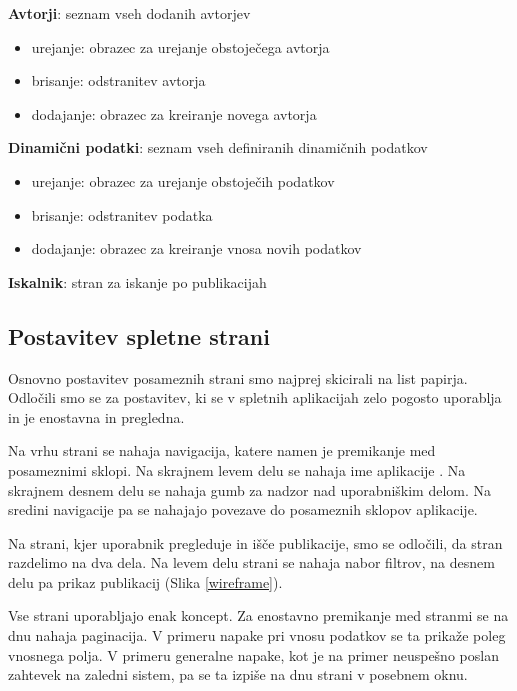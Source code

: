 \documentclass[a4paper, 12pt]{book}
\begin{document}
\begin{description}
\item \textbf{Avtorji}: seznam vseh dodanih avtorjev
\begin{itemize}
\item urejanje: obrazec za urejanje obstoječega avtorja
\item brisanje: odstranitev avtorja
\item dodajanje: obrazec za kreiranje novega avtorja
\end{itemize}

\item \textbf{Dinamični podatki}: seznam vseh definiranih dinamičnih podatkov
\begin{itemize}
\item urejanje: obrazec za urejanje obstoječih podatkov
\item brisanje: odstranitev podatka
\item dodajanje: obrazec za kreiranje vnosa novih podatkov
\end{itemize}

\item \textbf{Iskalnik}: stran za iskanje po publikacijah
\end{description}

\subsection{Postavitev spletne strani}
Osnovno postavitev posameznih strani smo najprej skicirali na list papirja. Odločili smo se za postavitev, ki se v spletnih aplikacijah zelo pogosto uporablja in je enostavna in pregledna.

Na vrhu strani se nahaja navigacija, katere namen je premikanje med posameznimi sklopi. Na skrajnem levem delu se nahaja ime aplikacije . Na skrajnem desnem delu se nahaja gumb za nadzor nad uporabniškim delom. Na sredini navigacije pa se nahajajo povezave do posameznih sklopov aplikacije.

Na strani, kjer uporabnik pregleduje in išče publikacije, smo se odločili, da stran razdelimo na dva dela. Na levem delu strani se nahaja nabor filtrov, na desnem delu pa prikaz publikacij (Slika \ref{wireframe}).

Vse strani uporabljajo enak koncept. Za enostavno premikanje med stranmi se na dnu nahaja paginacija. V primeru napake pri vnosu podatkov se ta prikaže poleg vnosnega polja. V primeru generalne napake, kot je na primer neuspešno poslan zahtevek na zaledni sistem, pa se ta izpiše na dnu strani v posebnem oknu.
\end{document}
